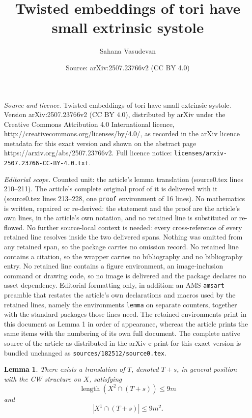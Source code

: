 \documentclass[10pt,a4paper]{amsart}
\title{Twisted embeddings of tori have small extrinsic systole}
\author{Sahana Vasudevan}
\date{Source: arXiv:2507.23766v2 (CC BY 4.0)}
\newtheorem{lemma}{Lemma}
\DeclareMathOperator*{\length}{length}
\begin{document}
\maketitle

\noindent\emph{Source and licence.} Twisted embeddings of tori have small extrinsic systole. Version arXiv:2507.23766v2 (CC BY 4.0), distributed by arXiv under the Creative Commons Attribution 4.0 International licence, http://creativecommons.org/licenses/by/4.0/, as recorded in the arXiv licence metadata for this exact version and shown on the abstract page https://arxiv.org/abs/2507.23766v2. Full licence notice: \texttt{licenses/arxiv-2507.23766-CC-BY-4.0.txt}.\par\smallskip

\noindent\textit{Editorial scope.} Counted unit: the article's lemma translation (source0.tex lines 210--211). The article's complete original proof of it is delivered with it (source0.tex lines 213--228, one \texttt{proof} environment of 16 lines). No mathematics is written, repaired or re-derived: the statement and the proof are the article's own lines, in the article's own notation, and no retained line is substituted or re-flowed.  No further source-local context is needed: every cross-reference of every retained line resolves inside the two delivered spans.  Nothing was omitted from any retained span, so the package carries no omission record.  No retained line contains a citation, so the wrapper carries no bibliography and no bibliography entry.  No retained line contains a figure environment, an image-inclusion command or drawing code, so no image is delivered and the package declares no asset dependency.  Editorial formatting only, in addition: an AMS \texttt{amsart} preamble that restates the article's own declarations and macros used by the retained lines, namely the environments \texttt{lemma} on separate counters, together with the standard packages those lines need.  The retained environments print in this document as Lemma 1 in order of appearance, whereas the article prints the same items with the numbering of its own full document.  The complete native source of the article as distributed in the arXiv e-print for this exact version is bundled unchanged as \texttt{sources/182512/source0.tex}.
\begin{lemma}\label{translation} There exists a translation of $T$, denoted $T+s$, in general position with the CW structure on $X$, satisfying $$\length(X^2\cap (T+s))\leq 9 m$$ and $$|X^1\cap (T+s)|\leq 9 m^2.$$
\end{lemma}
\end{document}

